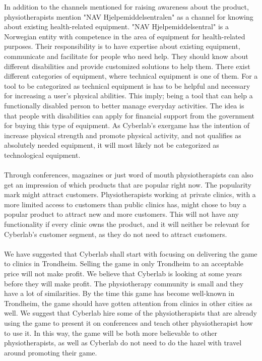 In addition to the channels mentioned for raising awareness about the product, physiotherapists mention "NAV Hjelpemiddelsentralen" as a channel for knowing about existing health-related equipment. "NAV Hjelpemiddelsentral" is a Norwegian entity with competence in the area of equipment for health-related purposes. Their responsibility is to have expertise about existing equipment, communicate and facilitate for people who need help. They should know about different disabilities and provide customized solutions to help them. There exist different categories of equipment, where technical equipment is one of them. For a tool to be categorized as technical equipment is has to be helpful and necessary for increasing a user’s physical abilities. This imply; being a tool that can help a functionally disabled person to better manage everyday activities. The idea is that people with disabilities can apply for financial support from the government for buying this type of equipment. As Cyberlab’s exergame has the intention of increase physical strength and promote physical activity, and not qualifies as absolutely needed equipment, it will most likely not be categorized as technological equipment. \cite{navhjelpemiddel} \cite{navhjelpemiddelsentralen}  \\ \\ 
Through conferences, magazines or just word of mouth physiotherapists can also get an impression of which products that are popular right now. The popularity mark might attract customers. Physiotherapists working at private clinics, with a more limited access to customers than public clinics has, might chose to buy a popular product to attract new and more customers. This will not have any functionality if every clinic owns the product, and it will neither be relevant for Cyberlab’s customer segment, as they do not need to attract customers. \\ \\ 
We have suggested that Cyberlab shall start with focusing on delivering the game to clinics in Trondheim. Selling the game in only Trondheim to an acceptable price will not make profit. We believe that Cyberlab is looking at some years before they will make profit. The physiotherapy community is small and they have a lot of similarities. By the time this game has become well-known in Trondheim, the game should have gotten attention from clinics in other cities as well. We suggest that Cyberlab hire some of the physiotherapists that are already using the game to present it on conferences and teach other physiotherapist how to use it. In this way, the game will be both more believable to other physiotherapists, as well as Cyberlab do not need to do the hazel with travel around promoting their game. \\ \\
